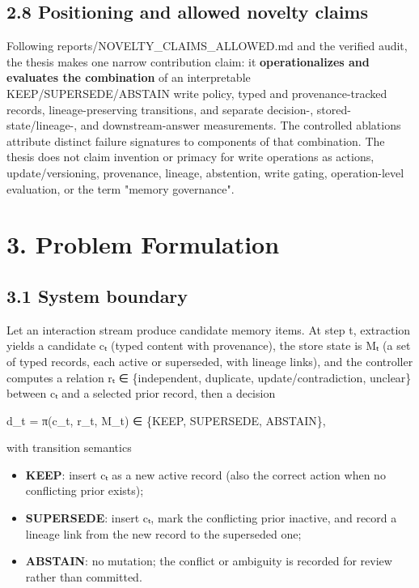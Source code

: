\subsection{2.8 Positioning and allowed novelty
claims}\label{positioning-and-allowed-novelty-claims}

Following reports/NOVELTY\_CLAIMS\_ALLOWED.md and the verified audit,
the thesis makes one narrow contribution claim: it
\textbf{operationalizes and evaluates the combination} of an
interpretable KEEP/SUPERSEDE/ABSTAIN write policy, typed and
provenance-tracked records, lineage-preserving transitions, and separate
decision-, stored-state/lineage-, and downstream-answer measurements.
The controlled ablations attribute distinct failure signatures to
components of that combination. The thesis does not claim invention or
primacy for write operations as actions, update/versioning, provenance,
lineage, abstention, write gating, operation-level evaluation, or the
term "memory governance".

\section{3. Problem Formulation}\label{problem-formulation}

\subsection{3.1 System boundary}\label{system-boundary}

Let an interaction stream produce candidate memory items. At step t,
extraction yields a candidate cₜ (typed content with provenance), the
store state is Mₜ (a set of typed records, each active or superseded,
with lineage links), and the controller computes a relation rₜ ∈
\{independent, duplicate, update/contradiction, unclear\} between cₜ and
a selected prior record, then a decision

d\_t = π(c\_t, r\_t, M\_t) ∈ \{KEEP, SUPERSEDE, ABSTAIN\},

with transition semantics

\begin{itemize}
\item
  \textbf{KEEP}: insert cₜ as a new active record (also the correct
  action when no conflicting prior exists);
\item
  \textbf{SUPERSEDE}: insert cₜ, mark the conflicting prior inactive,
  and record a lineage link from the new record to the superseded one;
\item
  \textbf{ABSTAIN}: no mutation; the conflict or ambiguity is recorded
  for review rather than committed.
\end{itemize}


